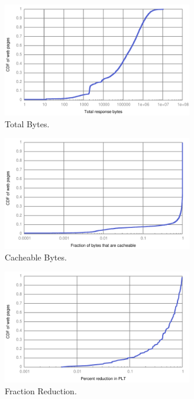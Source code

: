 
\begin{figure}[t]
    \includegraphics[width=3.25in]{../graphs/total_bytes/total_bytes.pdf}
    \caption[]{\label{fig:total_bytes} Total Bytes.}
\end{figure}

\begin{figure}[t]
    \includegraphics[width=3.25in]{../graphs/cacheable_bytes/cacheable_bytes.pdf}
    \caption[]{\label{fig:cacheable_bytes} Cacheable Bytes.}
\end{figure}

\begin{figure}[t]
    \includegraphics[width=3.25in]{../graphs/percent_plt_reduction/percent_reduction.pdf}
    \caption[]{\label{fig:percent_reduction} Fraction Reduction.}
\end{figure}

